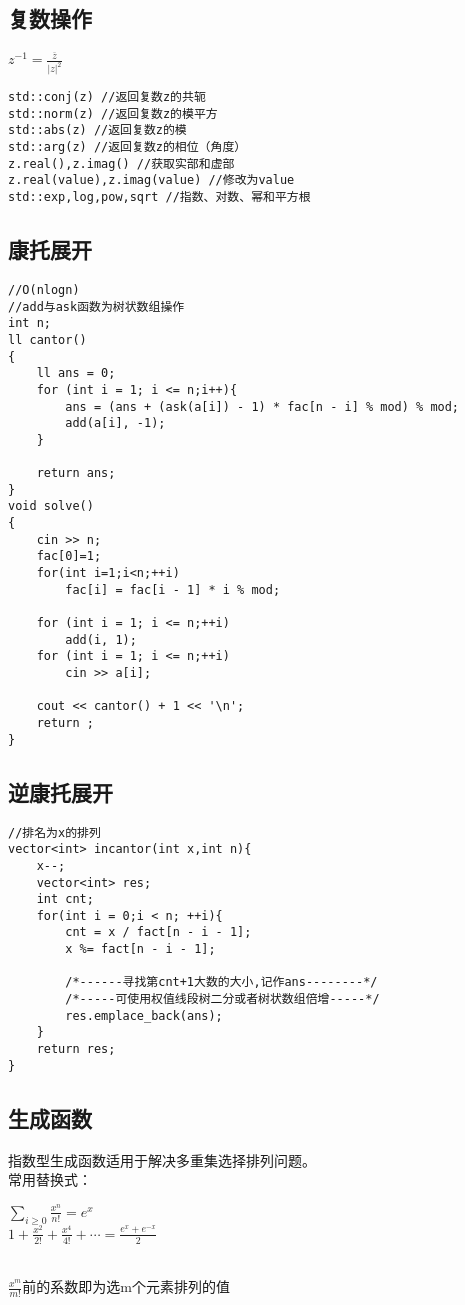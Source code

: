 \documentclass[twocolumn,a4]{article}
\begin{document}
\subsection{复数操作}
\begin{LARGE}
    $z^{-1}=\frac{\overline{z} }{|z|^{2}}$
\end{LARGE}
\begin{lstlisting}
std::conj(z) //返回复数z的共轭
std::norm(z) //返回复数z的模平方
std::abs(z) //返回复数z的模
std::arg(z) //返回复数z的相位（角度）
z.real(),z.imag() //获取实部和虚部
z.real(value),z.imag(value) //修改为value
std::exp,log,pow,sqrt //指数、对数、幂和平方根
\end{lstlisting}

\subsection{康托展开}
\begin{lstlisting}
//O(nlogn)
//add与ask函数为树状数组操作
int n;
ll cantor()
{
    ll ans = 0;
    for (int i = 1; i <= n;i++){
        ans = (ans + (ask(a[i]) - 1) * fac[n - i] % mod) % mod;
        add(a[i], -1);
    }

    return ans;
}
void solve()
{
    cin >> n;
    fac[0]=1;
    for(int i=1;i<n;++i)
        fac[i] = fac[i - 1] * i % mod;

    for (int i = 1; i <= n;++i)
        add(i, 1);
    for (int i = 1; i <= n;++i)
        cin >> a[i];
        
    cout << cantor() + 1 << '\n';
    return ;
}

\end{lstlisting}

\subsection{逆康托展开}
\begin{lstlisting}
//排名为x的排列
vector<int> incantor(int x,int n){
    x--;
    vector<int> res; 
    int cnt;
    for(int i = 0;i < n; ++i){
        cnt = x / fact[n - i - 1]; 
        x %= fact[n - i - 1];
        
        /*------寻找第cnt+1大数的大小,记作ans--------*/
        /*-----可使用权值线段树二分或者树状数组倍增-----*/
        res.emplace_back(ans);
    }
    return res;
}

\end{lstlisting}
\subsection{生成函数}
指数型生成函数适用于解决多重集选择排列问题。\\
常用替换式：\\
\begin{LARGE}
    $\sum_{i\geq 0} \frac{x^{n}}{n!}=e^{x}$\\
    $1+\frac{x^{2}}{2!}+\frac{x^{4}}{4!}+\cdots =\frac{e^{x}+e^{-x}}{2}$\\
\end{LARGE}
\\
$\frac{x^{m}}{m!}$前的系数即为选m个元素排列的值
\end{document}
